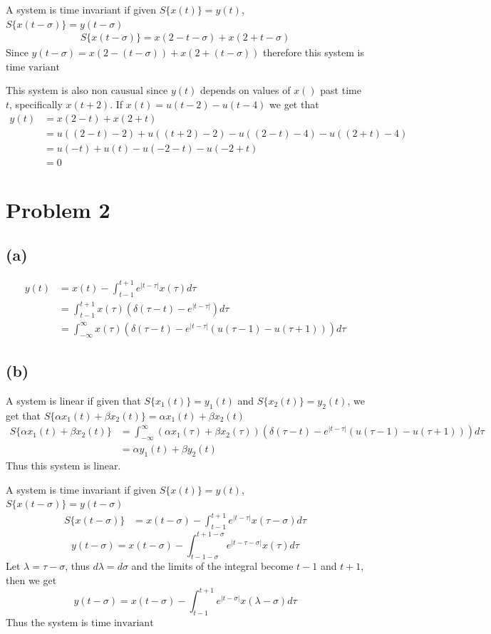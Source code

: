 \documentclass[12pt]{article}
\begin{document}
A system is time invariant if given $S\{x(t)\}=y(t)$, $S\{x(t-\sigma)\}=y(t-\sigma)$
\begin{align*}
S\{x(t-\sigma)\}=x(2-t-\sigma)+x(2+t-\sigma)
\end{align*}
Since $y(t-\sigma)=x(2-(t-\sigma))+x(2+(t-\sigma))$ therefore this system is $\boxed{\text{time variant}}$

This system is also $\boxed{\text{non causual}}$ since $y(t)$ depends on values of $x()$ past time $t$, specifically $x(t+2)$.
If $x(t)=u(t-2)-u(t-4)$ we get that
\begin{align*}
y(t)&=x(2-t)+x(2+t)\\
&=u((2-t)-2)+u((t+2)-2)-u((2-t)-4)-u((2+t)-4)\\
&=u(-t)+u(t)-u(-2-t)-u(-2+t)\\
&=\boxed{0}
\end{align*}
\section*{Problem 2}
\subsection*{(a)}
\begin{align*}
y(t)&=x(t)-\int_{t-1}^{t+1}e^{|t-\tau|}x(\tau)d\tau\\
&=\int_{t-1}^{t+1}x(\tau)(\delta(\tau-t)-e^{|t-\tau|})d\tau\\
&=\boxed{\int_{-\infty}^{\infty}x(\tau)\left(\delta(\tau-t)-e^{|t-\tau|}\left(u(\tau-1)-u(\tau+1)\right)\right)d\tau}
\end{align*}
\subsection*{(b)}
A system is linear if given that $S\{x_1(t)\}=y_1(t)$ and $S\{x_2(t)\}=y_2(t)$, we get that $S\{\alpha x_1(t)+\beta x_2(t)\}=\alpha x_1(t) +\beta x_2(t)$
\begin{align*}
S\{\alpha x_1(t)+\beta x_2(t)\}&=\int_{-\infty}^{\infty}\left(\alpha x_1(\tau)+\beta x_2(\tau)\right)\left(\delta(\tau-t)-e^{|t-\tau|}\left(u(\tau-1)-u(\tau+1)\right)\right)d\tau\\
&=\alpha y_1(t)+\beta y_2(t)
\end{align*}
Thus this system is $\boxed{\text{linear}}$.

A system is time invariant if given $S\{x(t)\}=y(t)$, $S\{x(t-\sigma)\}=y(t-\sigma)$
\begin{align*}
S\{x(t-\sigma)\}&=x(t-\sigma)-\int_{t-1}^{t+1}e^{|t-\tau|}x(\tau-\sigma)d\tau
\end{align*}
$$y(t-\sigma)=x(t-\sigma)-\int_{t-1-\sigma}^{t+1-\sigma}e^{|t-\tau-\sigma|}x(\tau)d\tau$$
Let $\lambda=\tau-\sigma$, thus $d\lambda=d\sigma$ and the limits of the integral become $t-1$ and $t+1$, then we get
$$y(t-\sigma)=x(t-\sigma)-\int_{t-1}^{t+1}e^{|t-\sigma|}x(\lambda-\sigma)d\tau$$
Thus the system is $\boxed{\text{time invariant}}$
\end{document}
